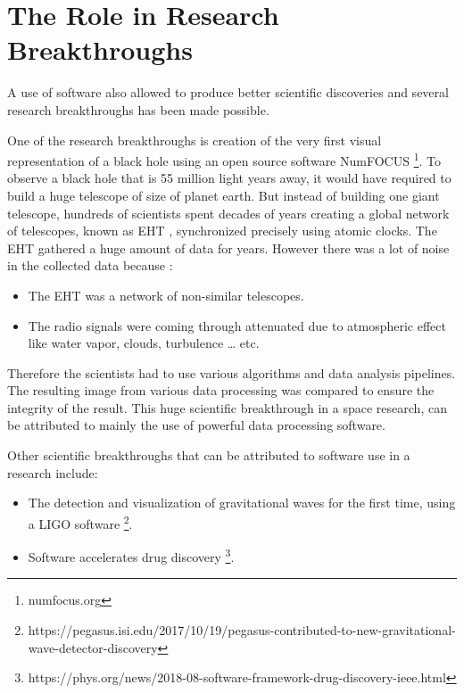 %

\section{The Role in Research Breakthroughs  }
\label{sec:background:second_section}
A use of software also allowed to produce better scientific discoveries and several research breakthroughs has been made possible\citep{goble2014better}. 

One of the research breakthroughs is creation of the very first visual representation of a black hole using an open source software NumFOCUS \footnote{numfocus.org}. To observe a black hole that is 55 million light years away, it would have required to build a huge telescope of size of planet earth. But instead of building one giant telescope, hundreds of scientists spent decades of years creating a global network of telescopes, known as \ac{EHT} \citep{enwiki:1052167868}, synchronized precisely using atomic clocks. The \ac{EHT} gathered a huge amount of data for years. However there was a lot of noise in the collected data because :


\vspace{-1mm}   %
	\begin{itemize}%
		\item The \ac{EHT} was a network of non-similar telescopes.
		\item The radio signals were coming through attenuated due to atmospheric effect like water vapor, clouds, turbulence … etc.
	\end{itemize}
Therefore the scientists had to use various algorithms and data analysis pipelines. The resulting image from various data processing was compared to ensure the integrity of the result. This huge scientific breakthrough in a space research, can be attributed to mainly the use of powerful data processing software. 

Other scientific breakthroughs that can be attributed to software use in a research include:

	\vspace{-1mm}   %
	\begin{itemize}%
		\item The detection and visualization of gravitational waves for the first time, using a \ac{LIGO} software \citep{enwiki:1047100294}\footnote{https://pegasus.isi.edu/2017/10/19/pegasus-contributed-to-new-gravitational-wave-detector-discovery}. 
		\item Software accelerates drug discovery \footnote{https://phys.org/news/2018-08-software-framework-drug-discovery-ieee.html}.
	\end{itemize}


